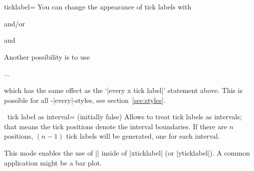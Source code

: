 \begin{pgfplotsxykey}{\x ticklabel=}
You can change the appearance of tick labels with
\begin{codeexample}
\end{codeexample}
and/or
\begin{codeexample}
\end{codeexample}
and
\begin{codeexample}
\end{codeexample}
Another possibility is to use 
\begin{codeexample}
\begin{axis}[y tick label style={above,
	/pgf/number format/fixed zerofill}
]
...
\end{axis}
\end{codeexample}
which has the same effect as the `|every x tick label|' statement above. This is possible for all \PGFPlots-|every|-styles, see section~\ref{sec:styles}.
\end{pgfplotsxykey}

\begin{pgfplotsxykey}{\x\ tick label as interval= (initially false)}
\label{key:pgfplots:ticklabelasinterval}
	Allows to treat tick labels as intervals; that means the tick positions denote the interval boundaries. If there are $n$ positions, $(n-1)$ tick labels will be generated, one for each interval.
\begin{codeexample}[]
\end{codeexample}
	This mode enables the use of |\nexttick| inside of |xticklabel| (or |yticklabel|). A common application might be a bar plot.
\begin{codeexample}[]
\end{codeexample}
\end{pgfplotsxykey}



